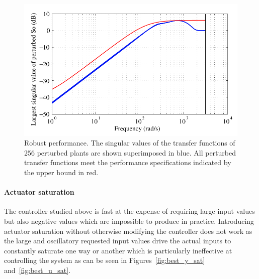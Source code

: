 \documentclass[12pt,lot, lof]{puthesis}
\begin{document}
\begin{figure}[htbp]
	\centering
	\includegraphics{chap10/robust_performance}
	\caption{Robust performance.
		The singular values of the transfer functions of 256 perturbed plants are shown superimposed in blue.
		All perturbed transfer functions meet the performance specifications indicated by the upper bound in red.}
	\label{fig:robust_performance}
\end{figure}


\paragraph{Actuator saturation}

The controller studied above is fast at the expense of requiring large input values but also negative values which are impossible to produce in practice.
Introducing actuator saturation without otherwise modifying the controller does not work as the large and oscillatory requested input values drive the actual inputs to constantly saturate one way or another which is particularly ineffective at controlling the system as can be seen in Figures~\ref{fig:best_y_sat} and~\ref{fig:best_u_sat}.
\end{document}
